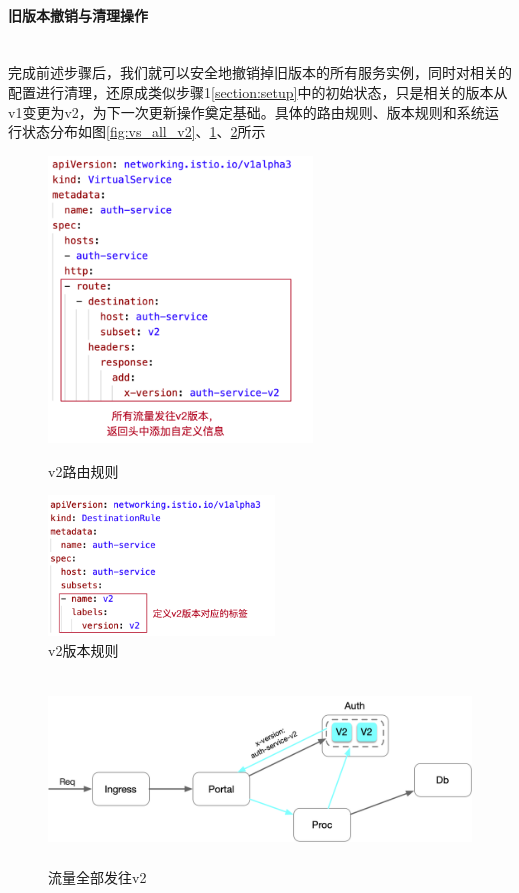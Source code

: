 \documentclass[a4paper]{article}
\theoremstyle{definition}
\begin{document}
\paragraph{旧版本撤销与清理操作}\mbox{}\\

完成前述步骤后，我们就可以安全地撤销掉旧版本的所有服务实例，同时对相关的配置进行清理，还原成类似步骤1\ref{section:setup}中的初始状态，只是相关的版本从v1变更为v2，为下一次更新操作奠定基础。具体的路由规则、版本规则和系统运行状态分布如图\ref{fig:vs_all_v2}、\ref{fig:dr_v2}、\ref{fig:traffic_all_v2}所示
\begin{figure}[!ht]
\centering
\begin{minipage}[t]{0.48\textwidth}
\centering
\centerline{\includegraphics[width=7cm]{vs_all_v2.png}}
\caption{v2路由规则}
\label{fig:vs_all_v2}
\end{minipage}
\begin{minipage}[t]{0.48\textwidth}
\centering
\centerline{\includegraphics[width=6cm]{dr_v2.png}}
\caption{v2版本规则}
\label{fig:dr_v2}
\end{minipage}
\end{figure}
\begin{figure}[!ht]
 \centering
 \includegraphics[height=5cm]{images/traffic_all_v2.png}
 \caption{流量全部发往v2}
 \label{fig:traffic_all_v2}
\end{figure}
\end{document}
